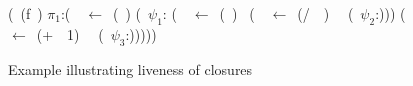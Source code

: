 \begin{figure}[t!]
  \centering
  \renewcommand{\arraystretch}{.8}
  \begin{uprogram}
    \UFL (\DEFINE~(f~\px)
     $\pi_1$:(\LET~\py~$\leftarrow $\
    (\length~\px) \IN
     (\SIF~$\psi_1$:\py
    (\LET~\pu~$\leftarrow$~(\Sum~\px)~\IN
     (\LET~\pw~$\leftarrow$\ (/~\pu~\py)~\IN\  (\SRETURN~$\psi_2$:\pw)))
    \UNL{5}(\LET~\pz~$\leftarrow$~(+~\py~1)~\IN\ \UNL{6} (\SRETURN~$\psi_3$:\pz)))))   
  \end{uprogram}
  \caption{Example illustrating liveness of closures}\label{fig:lv-closure}
  \vspace*{-5mm}
\end{figure}
